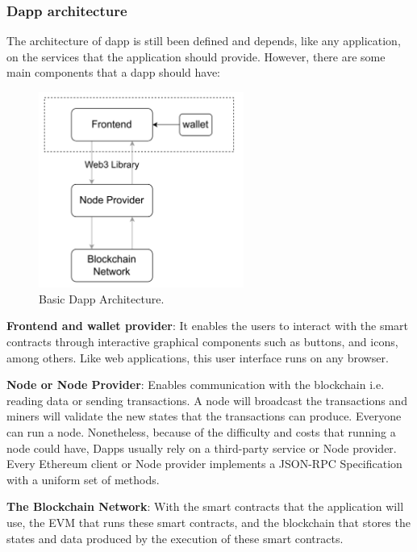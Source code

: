 \documentclass[11pt,a4paper]{report}
\begin{document}
\subsubsection{Dapp architecture}
The architecture of dapp is still been defined and depends, like any application, on the services that the application should provide. However, there are some main components that a dapp should have: 

\begin{figure}[htp]
	\centering
	\includegraphics[width=0.6\textwidth]{./images/dapp_components}
	\caption{Basic Dapp Architecture.}
	\label{fig:dapp_components}
\end{figure}

\begin{description}		
	\item \textbf{Frontend and wallet provider}: It enables the users to interact with the smart contracts through interactive graphical components such as buttons, and icons, among others. Like web applications, this user interface runs on any browser.
	\item \textbf{Node or Node Provider}: Enables communication with the blockchain i.e. reading data or sending transactions. A node will broadcast the transactions and miners will validate the new states that the transactions can produce. Everyone can run a node. Nonetheless, because of the difficulty and costs that running a node could have, Dapps usually rely on a third-party service or Node provider. Every Ethereum client or Node provider implements a JSON-RPC\cite{json_rpc} Specification with a uniform set of methods.
	\item \textbf{The Blockchain Network}: With the smart contracts that the application will use, the EVM that runs these smart contracts, and the blockchain that stores the states and data produced by the execution of these smart contracts.
\end{description}
\end{document}
